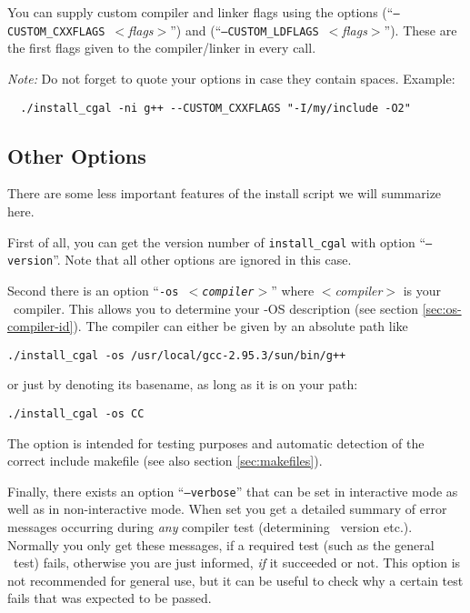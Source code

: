 You can supply custom compiler and linker flags using the options
\mbox{(``\texttt{--CUSTOM\_CXXFLAGS}
  \textit{$<$flags$>$}'')} and
\mbox{(``\texttt{--CUSTOM\_LDFLAGS}
  \textit{$<$flags$>$}'')}.  These are the
first flags given to the compiler/linker in every call.

\textit{Note:} Do not forget to quote your options in case they
contain spaces. Example:
\begin{verbatim}
  ./install_cgal -ni g++ --CUSTOM_CXXFLAGS "-I/my/include -O2"
\end{verbatim}

\subsection{Other Options}\label{sec:other-options}

There are some less important features of the install script we will
summarize here.

First of all, you can get the version number of \texttt{install\_cgal}
with option ``\texttt{--version}''. Note that all other options are
ignored in this case.

Second there is an option ``\texttt{-os \textit{$<$compiler$>$}}''
where \textit{$<$compiler$>$} is your \CC\ compiler. This allows you
to determine your \cgal-OS description (see section
\ref{sec:os-compiler-id}). The compiler can either be given by an
absolute path like
\begin{verbatim}
./install_cgal -os /usr/local/gcc-2.95.3/sun/bin/g++
\end{verbatim}
or just by denoting its basename, as long as it is on your path:
\begin{verbatim}
./install_cgal -os CC
\end{verbatim}
The option is intended for testing purposes and automatic detection of
the correct include makefile (see also section \ref{sec:makefiles}).

Finally, there exists an option
``\texttt{--verbose}'' that
can be set in interactive mode as well as in non-interactive mode.
When set you get a detailed summary of error messages occurring during
\textit{any} compiler test (determining \stl\ version etc.). Normally
you only get these messages, if a required test (such as the general
\stl\ test) fails, otherwise you are just informed, \textit{if} it
succeeded or not.  This option is not recommended for general use, but
it can be useful to check why a certain test fails that was expected
to be passed.

